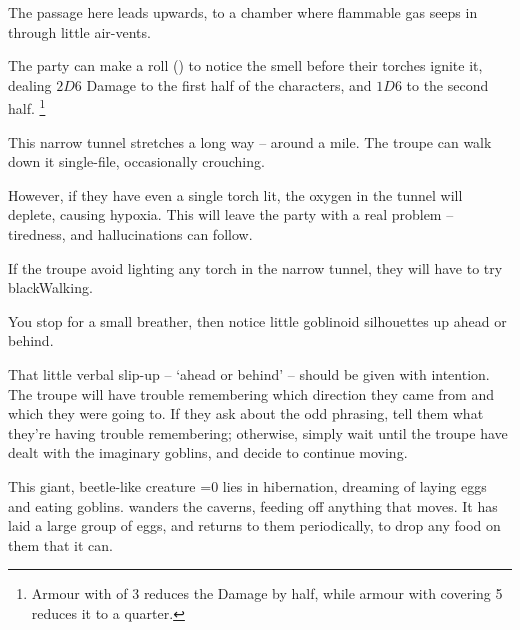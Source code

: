 \begin{multicols}{2}


The passage here leads upwards, to a chamber where flammable gas seeps in through little air-vents.

The party can make a  roll (\tn[12]) to notice the smell before their torches ignite it, dealing $2D6$ Damage to the first half of the characters, and $1D6$ to the second half.%
\footnote{Armour with  of 3 reduces the Damage by half, while armour with \gls{covering} 5 reduces it to a quarter.}



This narrow tunnel stretches a long way -- around a mile.
The troupe can walk down it single-file, occasionally crouching.

However, if they have even a single torch lit, the oxygen in the tunnel will deplete, causing \gls{hypoxia}.
This will leave the party with a real problem -- tiredness, and hallucinations can follow.

If the troupe avoid lighting any torch in the narrow tunnel, they will have to try \gls{blackWalking}.

\begin{boxtext}
  You stop for a small breather, then notice little goblinoid silhouettes up ahead or behind.
\end{boxtext}

That little verbal slip-up -- `ahead or behind' -- should be given with intention.
The troupe will have trouble remembering which direction they came from and which they were going to.
If they ask about the odd phrasing, tell them what they're having trouble remembering; otherwise, simply wait until the troupe have dealt with the imaginary goblins, and decide to continue moving.



\begin{exampletext}
  This giant, beetle-like creature%
  \ifnum\value{temperature}=0
    lies in hibernation, dreaming of laying eggs and eating goblins.
  \else
    wanders the caverns, feeding off anything that moves.
    It has laid a large group of eggs, and returns to them periodically, to drop any food on them that it can.
  \fi
\end{exampletext}


\end{multicols}

